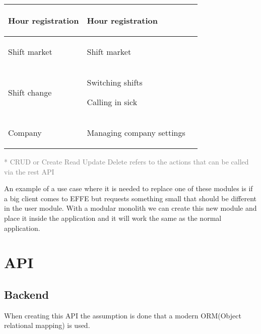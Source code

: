 \begin{tabularx}{\linewidth}{|>{}X|>{}X|>{}X|}
    Hour registration
     &
    \begin{compactitem}
        \item Hour registration
    \end{compactitem}
    \\ \hline

    Shift market
     &
    \begin{compactitem}
        \item Shift market
    \end{compactitem}
    \\ \hline

    Shift change
     &
    \begin{compactitem}
        \item Switching shifts
        \item Calling in sick
    \end{compactitem}
    \\ \hline

    Company
     &
    \begin{compactitem}
        \item Managing company settings
    \end{compactitem}
    \\ \hline
\end{tabularx}

\small{\textcolor{gray}{* CRUD or Create Read Update Delete refers to the actions that can be called via the rest API}}

An example of a use case where it is needed to replace one of these modules is if a big client comes to EFFE but requests something small that should be different in the user module. With a modular monolith we can create this new module and place it inside the application and it will work the same as the normal application.

\section{API}
\label{sec:API}

\subsection*{Backend}

When creating this API the assumption is done that a modern ORM(Object relational mapping) is used.


